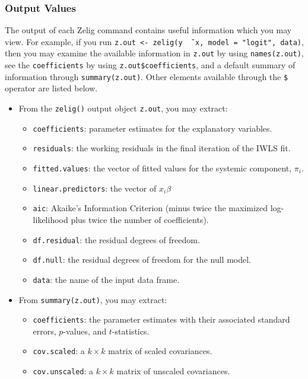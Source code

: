 \subsubsection{Output Values}

The output of each Zelig command contains useful information which you
may view.  For example, if you run \texttt{z.out <- zelig(y \~\, x,
  model = "logit", data)}, then you may examine the available
information in \texttt{z.out} by using \texttt{names(z.out)},
see the {\tt coefficients} by using {\tt z.out\$coefficients}, and
a default summary of information through \texttt{summary(z.out)}.
Other elements available through the {\tt \$} operator are listed
below.

\begin{itemize}
\item From the {\tt zelig()} output object {\tt z.out}, you may
  extract:
   \begin{itemize}
   \item {\tt coefficients}: parameter estimates for the explanatory
     variables.
   \item {\tt residuals}: the working residuals in the final iteration
     of the IWLS fit.
   \item {\tt fitted.values}: the vector of fitted values for the
     systemic component, $\pi_i$.
   \item {\tt linear.predictors}: the vector of $x_{i}\beta$
   \item {\tt aic}: Akaike's Information Criterion (minus twice the
     maximized log-likelihood plus twice the number of coefficients).
   \item {\tt df.residual}: the residual degrees of freedom.
   \item {\tt df.null}: the residual degrees of freedom for the null
     model.
   \item {\tt data}: the name of the input data frame.  
   \end{itemize}

\item From {\tt summary(z.out)}, you may extract: 
   \begin{itemize}
   \item {\tt coefficients}: the parameter estimates with their
     associated standard errors, $p$-values, and $t$-statistics.
   \item{\tt cov.scaled}: a $k \times k$ matrix of scaled covariances.
   \item{\tt cov.unscaled}: a $k \times k$ matrix of unscaled
     covariances.  
   \end{itemize}


\end{itemize}
